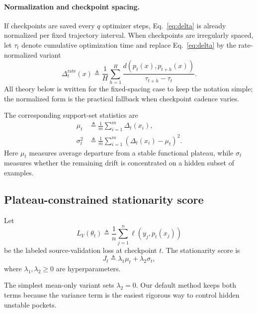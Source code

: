 \documentclass{article}
\begin{document}
\paragraph{Normalization and checkpoint spacing.}
If checkpoints are saved every $q$ optimizer steps, Eq.~\eqref{eq:delta} is already normalized per fixed trajectory interval. When checkpoints are irregularly spaced, let $\tau_t$ denote cumulative optimization time and replace Eq.~\eqref{eq:delta} by the rate-normalized variant
\begin{equation}
    \Delta_t^{\mathrm{rate}}(x)
    \triangleq
    \frac{1}{H}\sum_{h=1}^{H}
    \frac{
        d\!\left(p_t(x), p_{t+h}(x)\right)
    }{
        \tau_{t+h}-\tau_t
    }.
    \label{eq:delta_rate}
\end{equation}
All theory below is written for the fixed-spacing case to keep the notation simple; the normalized form is the practical fallback when checkpoint cadence varies.

The corresponding support-set statistics are
\begin{align}
    \mu_t &\triangleq \frac{1}{m}\sum_{i=1}^{m}\Delta_t(x_i), \label{eq:mu}\\
    \sigma_t^2 &\triangleq \frac{1}{m}\sum_{i=1}^{m}\left(\Delta_t(x_i)-\mu_t\right)^2. \label{eq:sigma}
\end{align}
Here $\mu_t$ measures average departure from a stable functional plateau, while $\sigma_t$ measures whether the remaining drift is concentrated on a hidden subset of examples.

\subsection{Plateau-constrained stationarity score}

Let
\begin{equation}
    L_V(\theta_t)
    \triangleq
    \frac{1}{n}\sum_{j=1}^{n}\ell\!\left(y_j, p_t(x_j)\right)
\end{equation}
be the labeled source-validation loss at checkpoint $t$. The stationarity score is
\begin{equation}
    J_t
    \triangleq
    \lambda_1 \mu_t
    + \lambda_2 \sigma_t,
    \label{eq:stationarity_score}
\end{equation}
where $\lambda_1,\lambda_2 \ge 0$ are hyperparameters.

The simplest mean-only variant sets $\lambda_2=0$. Our default method keeps both terms because the variance term is the easiest rigorous way to control hidden unstable pockets.
\end{document}
